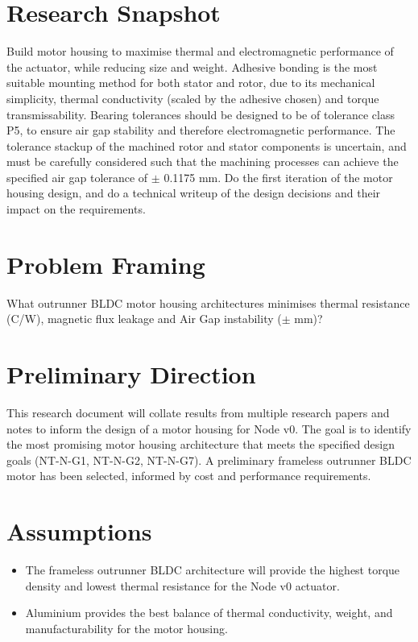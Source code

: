 \documentclass[internal]{../../classes/nervtech-research}
\begin{document}
\maketitle
\tableofcontents
\newpage

\section{Research Snapshot}
\researchsnapshot
{Build motor housing to maximise thermal and electromagnetic performance of the actuator, while reducing size and weight.}
{Adhesive bonding is the most suitable mounting method for both stator and rotor, due to its mechanical simplicity, thermal conductivity (scaled by the adhesive chosen) and torque transmissability.
Bearing tolerances should be designed to be of tolerance class P5, to ensure air gap stability and therefore electromagnetic performance.}
{The tolerance stackup of the machined rotor and stator components is uncertain, and must be carefully considered such that the machining processes can achieve the specified air gap tolerance of $\pm$ 0.1175 mm.}
{Do the first iteration of the motor housing design, and do a technical writeup of the design decisions and their impact on the requirements.}

\section{Problem Framing}
\begin{researchquestion}
  What outrunner BLDC motor housing architectures minimises thermal resistance (\textdegree C/W), magnetic flux leakage and Air Gap instability ($\pm$ mm)?
\end{researchquestion}

\section{Preliminary Direction}
This research document will collate results from multiple research papers and notes to inform the design of a motor housing for Node v0.
The goal is to identify the most promising motor housing architecture that meets the specified design goals (NT-N-G1, NT-N-G2, NT-N-G7).
A preliminary frameless outrunner BLDC motor has been selected, informed by cost and performance requirements.

\section{Assumptions}
\begin{itemize}
  \item The frameless outrunner BLDC architecture will provide the highest torque density and lowest thermal resistance for the Node v0 actuator.
  \item Aluminium provides the best balance of thermal conductivity, weight, and manufacturability for the motor housing.
\end{itemize}
\end{document}

